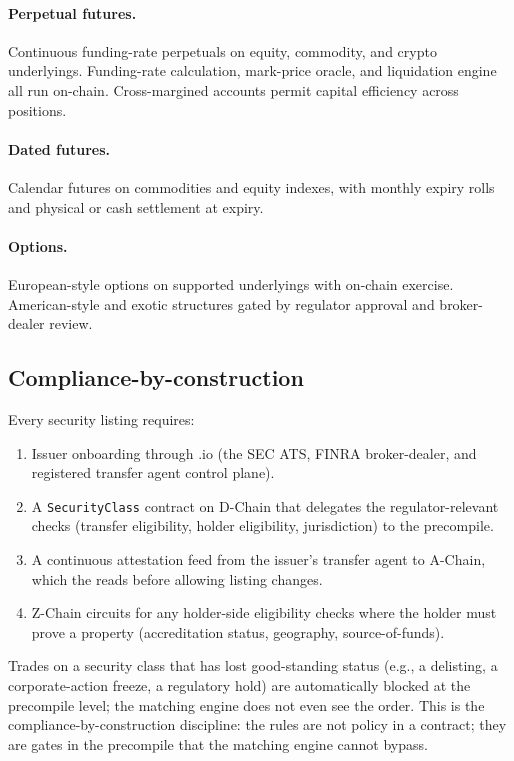 \paragraph{Perpetual futures.}
Continuous funding-rate perpetuals on equity, commodity, and crypto
underlyings. Funding-rate calculation, mark-price oracle, and
liquidation engine all run on-chain. Cross-margined accounts permit
capital efficiency across positions.

\paragraph{Dated futures.}
Calendar futures on commodities and equity indexes, with monthly
expiry rolls and physical or cash settlement at expiry.

\paragraph{Options.}
European-style options on supported underlyings with on-chain
exercise. American-style and exotic structures gated by regulator
approval and \Liquidity{} broker-dealer review.

\subsection{Compliance-by-construction}

Every security listing requires:

\begin{enumerate}[leftmargin=1.4em]
  \item Issuer onboarding through \Liquidity{}.io (the SEC ATS,
        FINRA broker-dealer, and registered transfer agent control
        plane).
  \item A \texttt{SecurityClass} contract on \Zoo{} D-Chain that
        delegates the regulator-relevant checks (transfer
        eligibility, holder eligibility, jurisdiction) to the
        \Liquidity{} precompile.
  \item A continuous attestation feed from the issuer's transfer
        agent to A-Chain, which the \DEX{} reads before allowing
        listing changes.
  \item Z-Chain \ZKP{} circuits for any holder-side eligibility
        checks where the holder must prove a property (accreditation
        status, geography, source-of-funds).
\end{enumerate}

Trades on a security class that has lost good-standing status (e.g.,
a delisting, a corporate-action freeze, a regulatory hold) are
automatically blocked at the precompile level; the matching engine
does not even see the order. This is the compliance-by-construction
discipline: the rules are not policy in a contract; they are gates
in the precompile that the matching engine cannot bypass.

